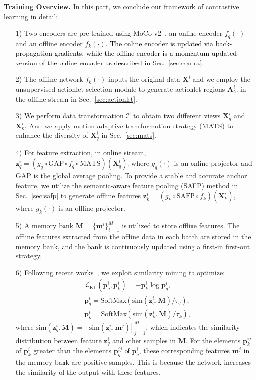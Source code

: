 \documentclass[twocolumn]{article}
\newcommand{\zjh}[1]{\textcolor{black}{#1}}
\begin{document}
\noindent\textbf{Training Overview.}
In this part, we conclude our framework of contrastive learning in detail: 
\begin{itemize}\setlength{\itemsep}{1.5pt} 
    \item[1)] Two encoders are pre-trained using MoCo v2~\cite{he2020momentum}, an online encoder $f_q(\cdot)$ and an offline encoder $f_k(\cdot)$.  \zjh{The online encoder is updated via back-propagation gradients, while the offline encoder is a momentum-updated version of the online encoder as described} in Sec.~\ref{sec:contra}.
    \item[2)] The offline network $f_k(\cdot)$ inputs the original data $\mathbf{X}^i$ and we employ the unsupervised actionlet selection module to generate actionlet regions $\mathbf{A}^i_{tv}$ in the offline stream in Sec.~\ref{sec:actionlet}.
    \item[3)] We perform data transformation $\mathcal{T}$ to obtain two different views $\mathbf{X}^i_q$ and $\mathbf{X}^i_k$. And we apply motion-adaptive transformation strategy (MATS) to enhance the diversity of $\mathbf{X}^i_q$ in Sec.~\ref{sec:mats}.
    \item[4)] For feature extraction, in online stream, $\mathbf{z}^i_q = (g_q \circ \text{GAP} \circ f_q \circ \text{MATS})(\mathbf{X}^i_q)$, where $g_q(\cdot)$ is an online projector and GAP is the global average pooling. To provide a stable and accurate anchor feature, we utilize the semantic-aware feature pooling (SAFP) method in Sec.~\ref{sec:safp} to generate offline features $\mathbf{z}^i_k = (g_k \circ \text{SAFP} \circ f_k)(\mathbf{X}^i_k)$, where $g_k(\cdot)$ is an offline projector. 
\item[5)]  A memory bank $\mathbf{M} = \{\mathbf{m}^i\}^M_{i=1}$ is utilized to store offline features. The offline features extracted from the offline data in each batch are stored in the memory bank, and the bank is continuously updated using a first-in first-out strategy.
    \item[6)] Following recent works~\cite{mao2022cmd,zhang2022contrastive}, we exploit similarity mining to optimize:
    \begin{equation}
    \label{equ:info}
    \begin{aligned}
    &\mathcal{L}_{\text{KL}}(\mathbf{p}_q^i, \mathbf{p}_k^i) = -\mathbf{p}_k^i \log \mathbf{p}_q^i,\\
    &\mathbf{p}_q^i = \text{SoftMax}(\text{sim}(\mathbf{z}^i_q, \mathbf{M})/\tau_q),\\
    &\mathbf{p}_k^i = \text{SoftMax}(\text{sim}(\mathbf{z}^i_k, \mathbf{M})/\tau_k),
    \end{aligned}
    \end{equation}
    where $\text{sim}(\mathbf{z}^i_q, \mathbf{M}) = [\text{sim}(\mathbf{z}^i_q, \mathbf{m}^j)]^M_{j=1}$, which indicates the similarity distribution between feature $\mathbf{z}^i_q$ and other samples in $\mathbf{M}$. For the elements $\mathbf{p}_k^{ij}$ of $\mathbf{p}_k^i$ greater than the elements $\mathbf{p}_q^{ij}$ of $\mathbf{p}_q^i$, these corresponding features $\mathbf{m}^j$ in the memory bank are positive samples. This is because the network increases the similarity of the output with these features.
\end{itemize}
\end{document}
